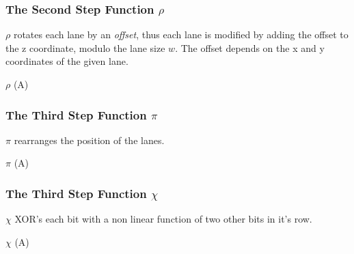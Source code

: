 \subsubsection{The Second Step Function $\rho$}
$\rho$ rotates each lane by an \emph{offset}, thus each lane is modified by adding the offset to the z coordinate, modulo the lane size $w$. The offset depends on the x and y coordinates of the given lane.
\begin{algorithm}[H]
\caption{$\rho$ (A)}
\label{algo:rho}
\begin{algorithmic}[1]
\EndFor{}
\EndFor{}
\EndFor{}
\end{algorithmic}
\end{algorithm}

\subsubsection{The Third Step Function $\pi$}
$\pi$ rearranges the position of the lanes.
\begin{algorithm}[H]
\caption{$\pi$ (A)}
\label{algo:pi}
\begin{algorithmic}[1]
\EndFor{}
\end{algorithmic}
\end{algorithm}

\subsubsection{The Third Step Function $\chi$}
$\chi$ XOR's each bit with a non linear function of two other bits in it's row.
\begin{algorithm}[H]
\caption{$\chi$ (A)}
\label{algo:chi}
\begin{algorithmic}[1]
\EndFor{}
\end{algorithmic}
\end{algorithm}

